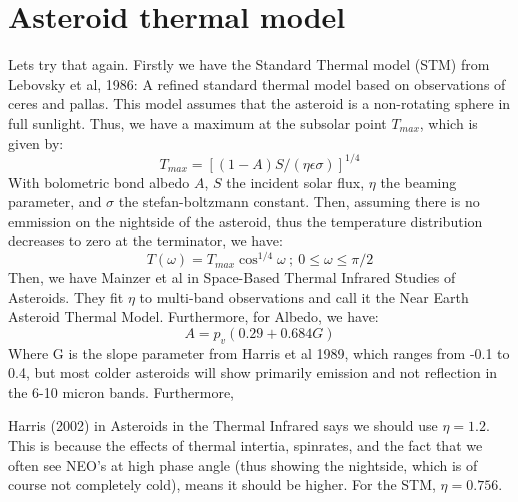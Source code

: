 \documentclass[a4paper,10pt]{article}
\begin{document}
\section{Asteroid thermal model}
Lets try that again. Firstly we have the Standard Thermal model (STM) from Lebovsky et al, 1986: A refined standard thermal model based on observations of ceres and pallas. This model assumes that the asteroid is a non-rotating sphere in full sunlight. Thus, we have a maximum at the subsolar point $T_{max}$, which is given by:
\begin{equation}
 T_{max} = \left[(1-A)S/(\eta \epsilon \sigma)\right]^{1/4}
\end{equation}
With bolometric bond albedo $A$, $S$ the incident solar flux, $\eta$ the beaming parameter, and $\sigma$ the stefan-boltzmann constant. Then, assuming there is no emmission on the nightside of the asteroid, thus the temperature distribution decreases to zero at the terminator, we have:
\begin{equation}
 T(\omega) = T_{max}\cos ^{1/4} \omega ~ ; ~ 0 \leq \omega \leq \pi/2
\end{equation}
Then, we have Mainzer et al in Space-Based Thermal Infrared Studies of Asteroids. They fit $\eta$ to multi-band observations and call it the Near Earth Asteroid Thermal Model. Furthermore, for Albedo, we have:
\begin{equation}
 A = p_v(0.29 + 0.684 G) 
\end{equation}
Where G is the slope parameter from Harris et al 1989, which ranges from -0.1 to 0.4, but most colder asteroids will show primarily emission and not reflection in the 6-10 micron bands. Furthermore, 

Harris (2002) in Asteroids in the Thermal Infrared says we should use $\eta = 1.2$. This is because the effects of thermal intertia, spinrates, and the fact that we often see NEO's at high phase angle (thus showing the nightside, which is of course not completely cold), means it should be higher. For the STM, $\eta = 0.756$.
\end{document}
